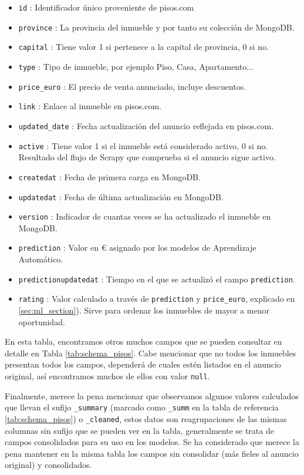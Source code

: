 \begin{itemize}
\item \texttt{id} : Identificador único proveniente de pisos.com
\item \texttt{province} : La provincia del inmueble y por tanto su colección de MongoDB.
\item \texttt{capital} : Tiene valor 1 si pertenece a la capital de provincia, 0 si no.
\item \texttt{type} : Tipo de inmueble, por ejemplo Piso, Casa, Apartamento...
\item \texttt{price\_euro} : El precio de venta anunciado, incluye descuentos.
\item \texttt{link} : Enlace al inmueble en pisos.com.
\item \texttt{updated\_date} : Fecha actualización del anuncio reflejada en pisos.com.
\item \texttt{active} : Tiene valor 1 si el inmueble está considerado activo, 0 si no. Resultado del flujo de Scrapy que comprueba si el anuncio sigue activo.
\item \texttt{createdat} : Fecha de primera carga en MongoDB.
\item \texttt{updatedat} : Fecha de última actualización en MongoDB.
\item \texttt{version} : Indicador de cuantas veces se ha actualizado el inmueble en MongoDB.
\item \texttt{prediction} : Valor en € asignado por los modelos de Aprendizaje Automático.
\item \texttt{predictionupdatedat} : Tiempo en el que se actualizó el campo \texttt{prediction}.
\item \texttt{rating} : Valor calculado a través de \texttt{prediction} y \texttt{price\_euro}, explicado en \ref{sec:ml_section}). Sirve para ordenar los inmuebles de mayor a menor oportunidad.
\end{itemize}

En esta tabla, encontramos otros muchos campos que se pueden consultar en detalle en Tabla \ref{tab:schema_pisos}. Cabe mencionar que no todos los inmuebles presentan todos los campos, dependerá de cuales estén listados en el anuncio original, así encontramos muchos de ellos con valor \texttt{null}.

Finalmente, merece la pena mencionar que observamos algunos valores calculados que llevan el sufijo \texttt{\_summary} (marcado como \texttt{\_summ} en la tabla de referencia \ref{tab:schema_pisos}) o \texttt{\_cleaned}, estos datos son reagrupaciones de las mismas columnas sin sufijo que se pueden ver en la tabla, generalmente se trata de campos consolidados para su uso en los modelos. Se ha considerado que merece la pena mantener en la misma tabla los campos sin consolidar (más fieles al anuncio original) y consolidados.


